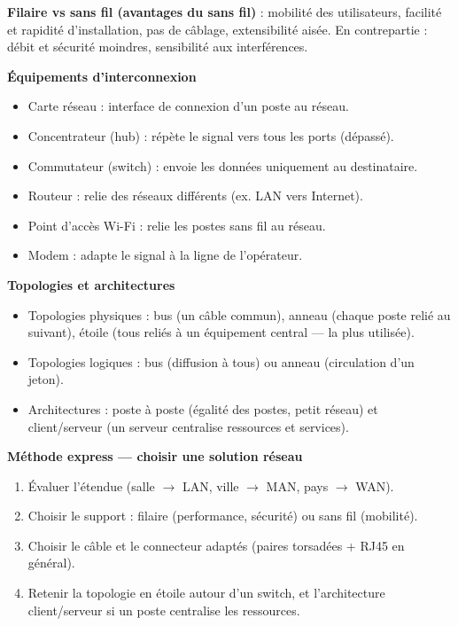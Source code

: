 \documentclass[11pt]{article}
\newcommand{\cle}[1]{{\popxbold\color{popdark}#1}}
\begin{document}
\begin{bilan}
\textbf{Filaire vs sans fil (avantages du sans fil)} : mobilité des utilisateurs, facilité et rapidité d'installation, pas de câblage, extensibilité aisée. En contrepartie : débit et sécurité moindres, sensibilité aux interférences.

\textbf{Équipements d'interconnexion}
\begin{itemize}
  \item \cle{Carte réseau} : interface de connexion d'un poste au réseau.
  \item \cle{Concentrateur (hub)} : répète le signal vers tous les ports (dépassé).
  \item \cle{Commutateur (switch)} : envoie les données uniquement au destinataire.
  \item \cle{Routeur} : relie des réseaux différents (ex. LAN vers Internet).
  \item \cle{Point d'accès Wi-Fi} : relie les postes sans fil au réseau.
  \item \cle{Modem} : adapte le signal à la ligne de l'opérateur.
\end{itemize}

\textbf{Topologies et architectures}
\begin{itemize}
  \item Topologies \cle{physiques} : bus (un câble commun), anneau (chaque poste relié au suivant), étoile (tous reliés à un équipement central — la plus utilisée).
  \item Topologies \cle{logiques} : bus (diffusion à tous) ou anneau (circulation d'un jeton).
  \item Architectures : \cle{poste à poste} (égalité des postes, petit réseau) et \cle{client/serveur} (un serveur centralise ressources et services).
\end{itemize}

\textbf{Méthode express — choisir une solution réseau}
\begin{enumerate}
  \item Évaluer l'étendue (salle $\to$ LAN, ville $\to$ MAN, pays $\to$ WAN).
  \item Choisir le support : filaire (performance, sécurité) ou sans fil (mobilité).
  \item Choisir le câble et le connecteur adaptés (paires torsadées + RJ45 en général).
  \item Retenir la topologie en étoile autour d'un switch, et l'architecture client/serveur si un poste centralise les ressources.
\end{enumerate}
\end{bilan}
\end{document}
